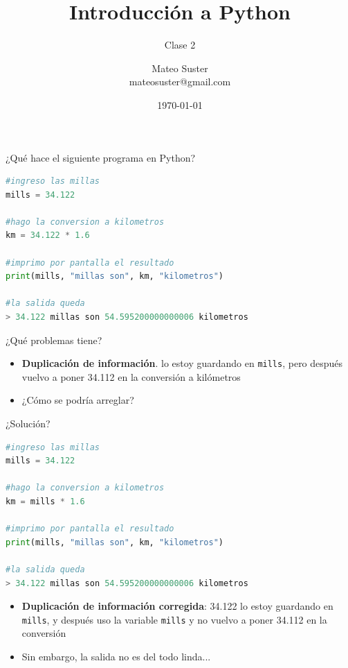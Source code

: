 \documentclass{beamer}
\title[Intro Prog] %
{Introducción a Python}
\subtitle
{Clase 2}
\author[MS]
{Mateo Suster \\ mateosuster@gmail.com}%
\institute[UNGS] %
{
  Matemática para Economistas III \\ 
  Instituto de Industria\\
  Universidad Nacional de General Sarmiento
}
\date[] %
{ \today}
\begin{document}
\begin{frame}
  \titlepage
\end{frame}


\begin{frame}[fragile]{¿Qué hace el siguiente programa en Python?} 
\begin{lstlisting}[language=Python]
#ingreso las millas 
mills = 34.122

#hago la conversion a kilometros
km = 34.122 * 1.6

#imprimo por pantalla el resultado
print(mills, "millas son", km, "kilometros")
	
#la salida queda 
> 34.122 millas son 54.595200000000006 kilometros
\end{lstlisting}  \pause

¿Qué problemas tiene? \pause

\begin{itemize}
    \item \textbf{Duplicación de información}.  lo estoy guardando en \texttt{mills}, pero después vuelvo a poner 34.112 en la conversión a kilómetros \pause
    \item ¿Cómo se podría arreglar?
\end{itemize}
\end{frame}

\begin{frame}[fragile]{¿Solución?} 
\begin{lstlisting}[language=Python]
#ingreso las millas 
mills = 34.122

#hago la conversion a kilometros
km = mills * 1.6

#imprimo por pantalla el resultado
print(mills, "millas son", km, "kilometros")

#la salida queda 
> 34.122 millas son 54.595200000000006 kilometros
\end{lstlisting} \pause

\begin{itemize}
    \item \textbf{Duplicación de información corregida}\pause : 34.122 lo estoy guardando en \texttt{mills}, y después uso la  variable \texttt{mills} y no vuelvo a poner 34.112 en la conversión \pause
    \item Sin embargo, la salida no es del todo linda...
\end{itemize}
\end{frame}
\end{document}

